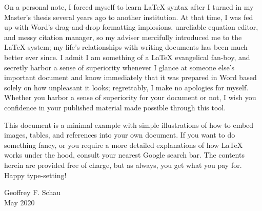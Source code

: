 On a personal note, I forced myself to learn LaTeX syntax after I turned in my Master's thesis several years ago to another institution. 
At that time, I was fed up with Word's drag-and-drop formatting implosions, unreliable equation editor, and messy citation manager, so my adviser mercifully introduced me to the LaTeX system; my life's relationships with writing documents has been much better ever since.
I admit I am something of a LaTeX evangelical fan-boy, and secretly harbor a sense of superiority whenever I glance at someone else's important document and know immediately that it was prepared in Word based solely on how unpleasant it looks; regrettably, I make no apologies for myself. 
Whether you harbor a sense of superiority for your document or not, I wish you confidence in your published material made possible through this tool.

This document is a minimal example with simple illustrations of how to embed images, tables, and references into your own document. 
If you want to do something fancy, or you require a more detailed explanations of how LaTeX works under the hood, consult your nearest Google search bar.
The contents herein are provided free of charge, but as always, you get what you pay for. \\
\hspace*{\fill} Happy type-setting!
\vspace{0.5in}

\hspace*{\fill} Geoffrey F. Schau \\
\hspace*{\fill} May 2020


